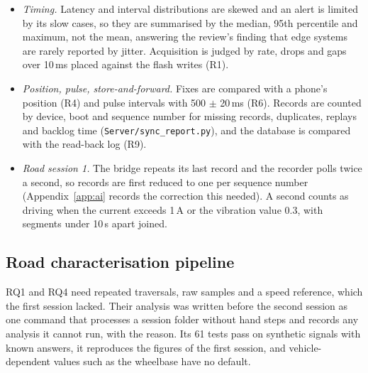 \begin{itemize}
\item \emph{Timing.} Latency and interval distributions are skewed and an alert is limited by its slow cases, so they are summarised by the median, 95th percentile and maximum, not the mean, answering the review's finding that edge systems are rarely reported by jitter. Acquisition is judged by rate, drops and gaps over 10\,ms placed against the flash writes (R1).
\item \emph{Position, pulse, store-and-forward.} Fixes are compared with a phone's position (R4) and pulse intervals with 500 $\pm$ 20\,ms (R6). Records are counted by device, boot and sequence number for missing records, duplicates, replays and backlog time (\texttt{Server/sync\_report.py}), and the database is compared with the read-back log (R9).
\item \emph{Road session 1.} The bridge repeats its last record and the recorder polls twice a second, so records are first reduced to one per sequence number (Appendix~\ref{app:ai} records the correction this needed). A second counts as driving when the current exceeds 1\,A or the vibration value 0.3, with segments under 10\,s apart joined.
\end{itemize}

\subsection{Road characterisation pipeline}
\label{sec:road-analysis}

RQ1 and RQ4 need repeated traversals, raw samples and a speed reference, which the first session lacked. Their analysis was written before the second session as one command that processes a session folder without hand steps and records any analysis it cannot run, with the reason. Its 61 tests pass on synthetic signals with known answers, it reproduces the figures of the first session, and vehicle-dependent values such as the wheelbase have no default.

